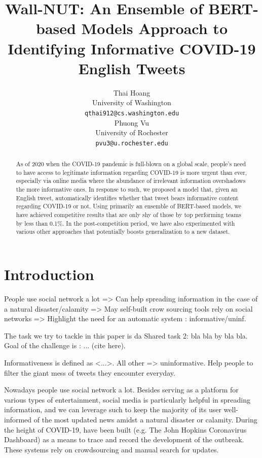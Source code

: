 \documentclass[11pt,a4paper]{article}
\title{Wall-NUT: An Ensemble of BERT-based Models Approach to Identifying Informative COVID-19 English Tweets}
\author{Thai Hoang \\
  University of Washington\\
  \texttt{qthai912@cs.washington.edu} \\\And
  Phuong Vu \\
  University of Rochester\\
  \texttt{pvu3@u.rochester.edu} \\}
\date{}
\begin{document}
\maketitle
\begin{abstract}

As of 2020 when the COVID-19 pandemic is full-blown on a global scale, people's need to have access to legitimate information regarding COVID-19 is more urgent than ever, especially via online media where the abundance of irrelevant information overshadows the more informative ones. In response to such, we proposed a model that, given an English tweet, automatically identifies whether that tweet bears informative content regarding COVID-19 or not. Using primarily an ensemble of BERT-based models, we have achieved competitive results that are only shy of those by top performing teams by less than 0.1\%. In the post-competition period, we have also experimented with various other approaches that potentially boosts generalization to a new dataset.

\end{abstract}

\section{Introduction}

People use social network a lot => Can help spreading information in the case of a natural disaster/calamity => May self-built crow sourcing tools rely on social networks => Highlight the need for an automatic system : informative/uninf.

The task we try to tackle in this paper is da Shared task 2: bla bla by bla bla. Goal of the challenge is : ... (cite here). 

Informativeness is defined as <...>. All other => uninformative. Help people to filter the giant mess of tweets they encounter everyday. 


Nowadays people use social network a lot. Besides serving as a platform for various types of entertainment, social media is particularly helpful in spreading information, and we can leverage such to keep the majority of its user well-informed of the most updated news amidst a natural disaster or calamity. During the height of COVID-19, have been built (e.g. The John Hopkins Coronavirus Dashboard) as a means to trace and record the development of the outbreak. These systems rely on crowdsourcing and manual search for updates. 
\end{document}
